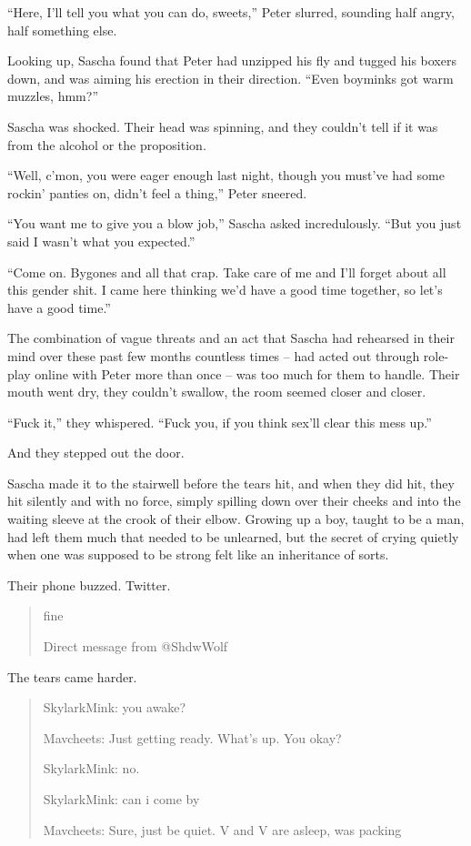 ``Here, I'll tell you what you can do, sweets,'' Peter slurred, sounding half angry, half something else.

Looking up, Sascha found that Peter had unzipped his fly and tugged his boxers down, and was aiming his erection in their direction. ``Even boyminks got warm muzzles, hmm?''

Sascha was shocked. Their head was spinning, and they couldn't tell if it was from the alcohol or the proposition.

``Well, c'mon, you were eager enough last night, though you must've had some rockin' panties on, didn't feel a thing,'' Peter sneered.

``You want me to give you a blow job,'' Sascha asked incredulously. ``But you just said I wasn't what you expected.''

``Come on. Bygones and all that crap. Take care of me and I'll forget about all this gender shit. I came here thinking we'd have a good time together, so let's have a good time.''

The combination of vague threats and an act that Sascha had rehearsed in their mind over these past few months countless times -- had acted out through role-play online with Peter more than once -- was too much for them to handle. Their mouth went dry, they couldn't swallow, the room seemed closer and closer.

``Fuck it,'' they whispered. ``Fuck you, if you think sex'll clear this mess up.''

And they stepped out the door.

\secdiv

Sascha made it to the stairwell before the tears hit, and when they did hit, they hit silently and with no force, simply spilling down over their cheeks and into the waiting sleeve at the crook of their elbow. Growing up a boy, taught to be a man, had left them much that needed to be unlearned, but the secret of crying quietly when one was supposed to be strong felt like an inheritance of sorts.

Their phone buzzed. Twitter.

\begin{quotation}
  fine

  Direct message from @ShdwWolf
\end{quotation}

The tears came harder.

\secdiv

\begin{quotation}
  SkylarkMink: you awake?

  Mavcheets: Just getting ready.  What's up.  You okay?

  SkylarkMink: no.

  SkylarkMink: can i come by

  Mavcheets: Sure, just be quiet. V and V are asleep, was packing
\end{quotation}

